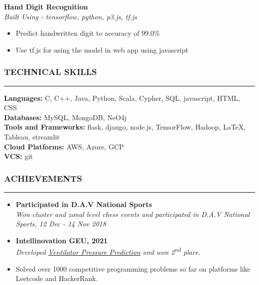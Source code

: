 \documentclass[a4paper]{article}
\begin{document}
\vspace{10pt}
\noindent
\textbf{Hand Digit Recognition} \\
\textit{Built Using - tensorflow, python, p3.js, tf.js}
\begin{itemize}[leftmargin=*, nosep]
    \item Predict handwritten digit to accuracy of 99.0\%
    \item Use tf.js for using the model in web app using javascript
\end{itemize}


\subsubsection*{TECHNICAL SKILLS}
\hrule
\vspace{10pt}
\textbf{Languages: } C, C++, Java, Python, Scala, Cypher, SQL, javascript, HTML, CSS \\
\textbf{Databases: } MySQL, MongoDB, NeO4j \\
\textbf{Tools and Frameworks: } flask, django, node.js, TensorFlow, Hadoop, \LaTeX, Tableau, streamlit \\
\textbf{Cloud Platforms: } AWS, Azure, GCP \\
\textbf{VCS: } git

\subsubsection*{ACHIEVEMENTS}
\hrule
\vspace{10pt}

\begin{itemize}[leftmargin=*, nosep]
    \item \noindent \textbf{Participated in D.A.V National Sports} \\
          \textit{Won cluster and zonal level chess events and participated in D.A.V National Sports, 12 Dec - 14 Nov 2018}
    \item \noindent \textbf{Intellinovation GEU, 2021} \\
          \textit{Developed \href{https://www.github.com/Bot-7037/Ventilator-Pressure-Prediction}{Ventilator Pressure Prediction} 
          and won 2\textsuperscript{nd} place.}
    \item Solved over 1000 competitive programming problems so far on platforms like Leetcode and HackerRank.
\end{itemize}
\end{document}
